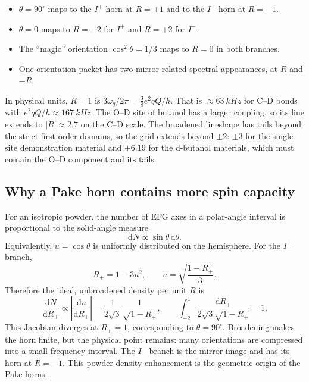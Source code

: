 \documentclass[11pt]{article}
\newcommand{\Iplus}{I^{+}}
\newcommand{\Iminus}{I^{-}}
\newcommand{\dd}{\mathrm{d}}
\begin{document}
\begin{itemize}
  \item \(\theta=90^\circ\) maps to the \(\Iplus\) horn at \(R=+1\) and to the \(\Iminus\) horn at \(R=-1\).
  \item \(\theta=0\) maps to \(R=-2\) for \(\Iplus\) and \(R=+2\) for \(\Iminus\).
  \item The ``magic'' orientation \(\cos^2\theta=1/3\) maps to \(R=0\) in both branches.
  \item One orientation packet has two mirror-related spectral appearances, at \(R\) and \(-R\).
\end{itemize}

In physical units, \(R=1\) is \(3\omega_q/2\pi=\tfrac38e^2qQ/h\). That is
\(\approx\SI{63}{kHz}\) for C--D bonds with \(e^2qQ/h\approx\SI{167}{kHz}\). The O--D site of
butanol has a larger coupling, so its line extends to \(|R|\approx2.7\) on the C--D scale. The
broadened lineshape has tails beyond the strict first-order domains, so the grid extends beyond
\(\pm2\): \(\pm3\) for the single-site demonstration material and \(\pm6.19\) for the d-butanol
materials, which must contain the O--D component and its tails.

\subsection{Why a Pake horn contains more spin capacity}

For an isotropic powder, the number of EFG axes in a polar-angle interval is proportional to the
solid-angle measure
\begin{equation}
  \dd N \propto \sin\theta\,\dd\theta.
\end{equation}
Equivalently, \(u=\cos\theta\) is uniformly distributed on the hemisphere. For the \(\Iplus\)
branch,
\begin{equation}
  R_{+}=1-3u^2,
  \qquad
  u=\sqrt{\frac{1-R_{+}}{3}}.
\end{equation}
Therefore the ideal, unbroadened density per unit \(R\) is
\begin{equation}
  \frac{\dd N}{\dd R_{+}}
  \propto
  \left|\frac{\dd u}{\dd R_{+}}\right|
  = \frac{1}{2\sqrt{3}}\frac{1}{\sqrt{1-R_{+}}},
  \qquad
  \int_{-2}^{1}\frac{\dd R_+}{2\sqrt3\sqrt{1-R_+}}=1 .
  \label{eq:pakejacobian}
\end{equation}
This Jacobian diverges at \(R_{+}=1\), corresponding to \(\theta=90^\circ\). Broadening makes the
horn finite, but the physical point remains: many orientations are compressed into a small
frequency interval. The \(\Iminus\) branch is the mirror image and has its horn at \(R=-1\).
This powder-density enhancement is the geometric origin of the Pake horns
\cite{Pake1948,Abragam1961}.
\end{document}
